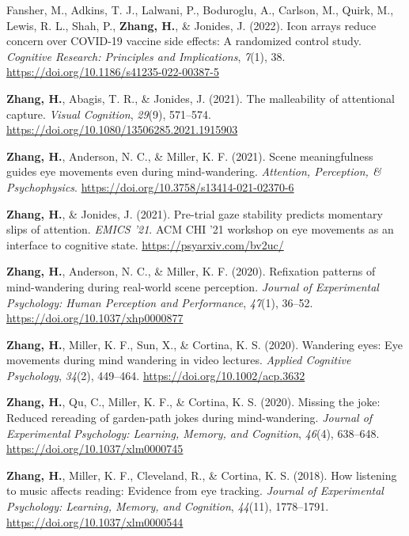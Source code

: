 \documentclass[11pt,a4paper,]{awesome-cv}
\begin{document}
\leavevmode{}%
Fansher, M., Adkins, T. J., Lalwani, P., Boduroglu, A., Carlson, M.,
Quirk, M., Lewis, R. L., Shah, P., \textbf{Zhang, H.}, \& Jonides, J.
(2022). Icon arrays reduce concern over COVID-19 vaccine side effects: A
randomized control study. \emph{Cognitive Research: Principles and
Implications}, \emph{7}(1), 38.
\url{https://doi.org/10.1186/s41235-022-00387-5}

\leavevmode{}%
\textbf{Zhang, H.}, Abagis, T. R., \& Jonides, J. (2021). The
malleability of attentional capture. \emph{Visual Cognition},
\emph{29}(9), 571--574.
\url{https://doi.org/10.1080/13506285.2021.1915903}

\leavevmode{}%
\textbf{Zhang, H.}, Anderson, N. C., \& Miller, K. F. (2021). Scene
meaningfulness guides eye movements even during mind-wandering.
\emph{Attention, Perception, \& Psychophysics}.
\url{https://doi.org/10.3758/s13414-021-02370-6}

\leavevmode{}%
\textbf{Zhang, H.}, \& Jonides, J. (2021). Pre-trial gaze stability
predicts momentary slips of attention. \emph{EMICS '21}. ACM CHI '21
workshop on eye movements as an interface to cognitive state.
\url{https://psyarxiv.com/bv2uc/}

\leavevmode{}%
\textbf{Zhang, H.}, Anderson, N. C., \& Miller, K. F. (2020). Refixation
patterns of mind-wandering during real-world scene perception.
\emph{Journal of Experimental Psychology: Human Perception and
Performance}, \emph{47}(1), 36--52.
\url{https://doi.org/10.1037/xhp0000877}

\leavevmode{}%
\textbf{Zhang, H.}, Miller, K. F., Sun, X., \& Cortina, K. S. (2020).
Wandering eyes: Eye movements during mind wandering in video lectures.
\emph{Applied Cognitive Psychology}, \emph{34}(2), 449--464.
\url{https://doi.org/10.1002/acp.3632}

\leavevmode{}%
\textbf{Zhang, H.}, Qu, C., Miller, K. F., \& Cortina, K. S. (2020).
Missing the joke: Reduced rereading of garden-path jokes during
mind-wandering. \emph{Journal of Experimental Psychology: Learning,
Memory, and Cognition}, \emph{46}(4), 638--648.
\url{https://doi.org/10.1037/xlm0000745}

\leavevmode{}%
\textbf{Zhang, H.}, Miller, K. F., Cleveland, R., \& Cortina, K. S.
(2018). How listening to music affects reading: Evidence from eye
tracking. \emph{Journal of Experimental Psychology: Learning, Memory,
and Cognition}, \emph{44}(11), 1778--1791.
\url{https://doi.org/10.1037/xlm0000544}
\end{document}
